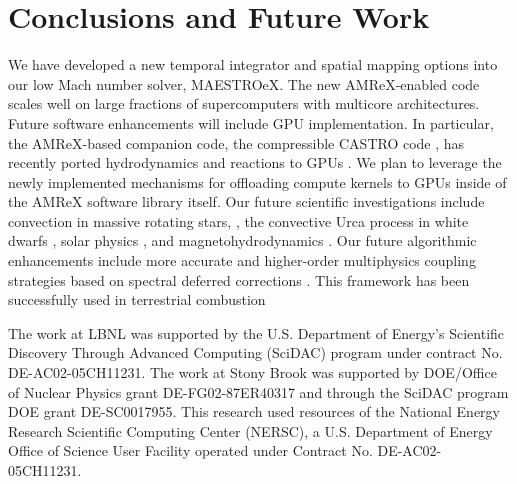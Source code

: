 \section{Conclusions and Future Work}\label{sec:conclusions}
We have developed a new temporal integrator and spatial mapping options into our low Mach number solver, MAESTROeX.
The new AMReX-enabled code scales well on large fractions of supercomputers with multicore architectures.
Future software enhancements will include GPU implementation.
In particular, the AMReX-based companion code, the compressible CASTRO code \citep{CASTRO}, has recently ported hydrodynamics and reactions to GPUs \citep{CASTRO_GPU}.
We plan to leverage the newly implemented mechanisms for offloading compute kernels to GPUs inside of the AMReX software library itself.
Our future scientific investigations include convection in massive rotating stars, \citep{heger2000presupernova}, the convective Urca process in white dwarfs \citep{willcox2016type}, solar physics \citep{wood2018self}, and magnetohydrodynamics \citep{wood2015three,wood2011sun}.
Our future algorithmic enhancements include more accurate and higher-order multiphysics coupling strategies based on spectral deferred corrections \citep{dutt2000spectral,bourlioux2003high}.
This framework has been successfully used in terrestrial combustion \citep{pazner2016high,nonaka2018conservative}

\acknowledgements

The work at LBNL was supported by the U.S. Department of Energy's
Scientific Discovery Through Advanced Computing (SciDAC) program under
contract No. DE-AC02-05CH11231.  The work at Stony Brook was supported
by DOE/Office of Nuclear Physics grant DE-FG02-87ER40317 and through
the SciDAC program DOE grant DE-SC0017955.  This research used
resources of the National Energy Research Scientific Computing Center
(NERSC), a U.S. Department of Energy Office of Science User Facility
operated under Contract No. DE-AC02-05CH11231.


